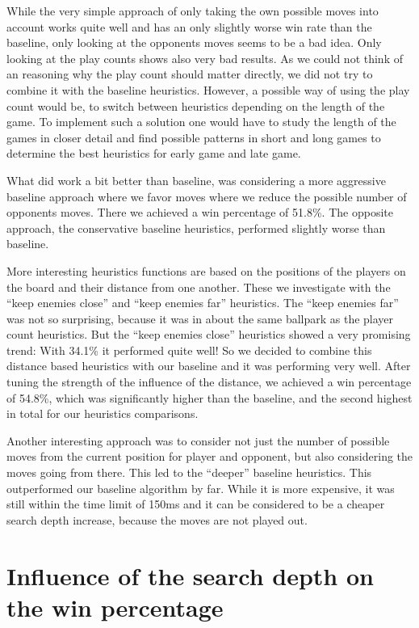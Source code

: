 \documentclass[aps,prd,notitlepage,floatfix,superscriptaddress,groupedaddress,nofootinbib]{revtex4-1}
\begin{document}
While the very simple approach of only taking the own possible moves into account works quite well and has an only slightly worse win rate than the baseline, only looking at the opponents moves seems to be a bad idea. Only looking at the play counts shows also very bad results. As we could not think of an reasoning why the play count should matter directly, we did not try to combine it with the baseline heuristics. However, a possible way of using the play count would be, to switch between heuristics depending on the length of the game. To implement such a solution one would have to study the length of the games in closer detail and find possible patterns in short and long games to determine the best heuristics for early game and late game.

What did work a bit better than baseline, was considering a more aggressive baseline approach where we favor moves where we reduce the possible number of opponents moves. There we achieved a win percentage of 51.8\%. The opposite approach, the conservative baseline heuristics, performed slightly worse than baseline.

More interesting heuristics functions are based on the positions of the players on the board and their distance from one another. These we investigate with the ``keep enemies close'' and ``keep enemies far'' heuristics. The ``keep enemies far'' was not so surprising, because it was in about the same ballpark as the player count heuristics. But the ``keep enemies close'' heuristics showed a very promising trend: With 34.1\% it performed quite well! So we decided to combine this distance based heuristics with our baseline and it was performing very well. After tuning the strength of the influence of the distance, we achieved a win percentage of 54.8\%, which was significantly higher than the baseline, and the second highest in total for our heuristics comparisons.

Another interesting approach was to consider not just the number of possible moves from the current position for player and opponent, but also considering the moves going from there. This led to the ``deeper'' baseline heuristics. This outperformed our baseline algorithm by far. While it is more expensive, it was still within the time limit of 150ms and it can be considered to be a cheaper search depth increase, because the moves are not played out.

\section{\label{sec:search_depth}Influence of the search depth on the win percentage}
\end{document}
